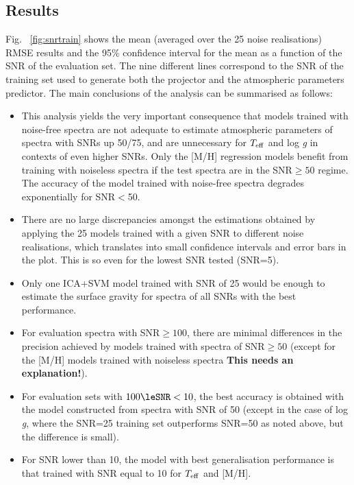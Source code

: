 \documentclass[a4paper,fleqn,usenatbib]{mnras}
\begin{document}
{{{\subsection{Results}

Fig.~ \ref{fig:snrtrain} shows the mean (averaged over the 25 noise
realisations) RMSE results and the 95\% confidence interval for the
mean as a function of the SNR of the evaluation set. The nine
different lines correspond to the SNR of the training set used to
generate both the projector and the atmospheric parameters predictor.
The main conclusions of the analysis can be summarised as follows:

\begin{itemize}
\item This analysis yields the very important consequence that models
  trained with noise-free spectra are not adequate to estimate
  atmospheric parameters of spectra with SNRs up 50/75, and are
  unnecessary for $T_{\rm eff}$ and log \textit{g} in contexts of even
  higher SNRs. Only the [M/H] regression models benefit from training
  with noiseless spectra if the test spectra are in the SNR$\ge 50$
  regime. The accuracy of the model trained with noise-free spectra
  degrades exponentially for SNR$<$50.
\item There are no large discrepancies amongst the estimations
  obtained by applying the 25 models trained with a given SNR to
  different noise realisations, which translates into small confidence
  intervals and error bars in the plot. This is so even for the lowest
  SNR tested (SNR=5).
\item Only one ICA+SVM model trained with SNR of 25 would be enough to
  estimate the surface gravity for spectra of all SNRs with the best
  performance.
\item For evaluation spectra with SNR$\ge 100$, there are minimal
  differences in the precision achieved by models trained with spectra
  of SNR$\ge 50$ (except for the [M/H] models trained with noiseless
  spectra {\bf This needs an explanation!}).  
\item For evaluation sets with $100\leSNR<10$, the best accuracy is
  obtained with the model constructed from spectra with SNR of 50
  (except in the case of log {\it g}, where the SNR=25 training set
  outperforms SNR=50 as noted above, but the difference is small).
\item For SNR lower than 10, the model with best generalisation
  performance is that trained with SNR equal to 10 for $T_{\rm eff}$ 
  and [M/H]. 
\end{itemize}

}}}
\end{document}
